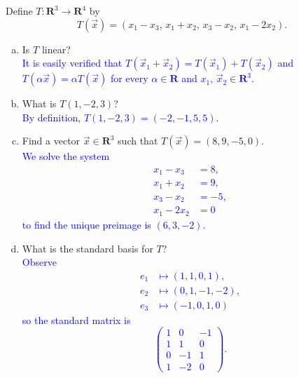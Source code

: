 \documentclass[a4paper,11pt]{article}
\newcommand{\R}{\mathbf{R}}
\newcommand{\BB}[1]{\textcolor{blue}{#1}}
\begin{document}
 Define $T : \R^3 \rightarrow \R^4$ by
\[
  T(\vec x) = (x_1-x_3,\, x_1+x_2,\,x_3-x_2,\,x_1-2x_2).
\]
\begin{enumerate}[(a)]
\item Is $T$ linear? \\

  \BB{It is easily verified that $T(\vec x_1 + \vec x_2)=T(\vec x_1) + T(\vec
    x_2)$ and $T(\alpha\vec x)=\alpha T(\vec x)$ for every $\alpha \in \R$ and
    $x_1,\,\vec x_2 \in \R^3$. \\}
  
\item What is $T(1,-2,3)$? \\

  \BB{By definition, $T(1,-2,3)=(-2,-1,5,5)$. \\}
  
\item Find a vector $\vec x \in \R^3$ such that $T(\vec x)=(8,9,-5,0)$. \\

  \BB{We solve the system
    \begin{align*}
      x_1 - x_3 &= 8, \\
      x_1 + x_2 &= 9, \\
      x_3 - x_2 &= -5, \\
      x_1 - 2x_2 &= 0
    \end{align*}
    to find the unique preimage is $(6,3,-2)$. \\}
  
\item What is the standard basis for $T$? \\

  \BB{Observe
    \begin{align*}
      e_1 &\mapsto (1,1,0,1), \\
      e_2 &\mapsto (0,1,-1,-2), \\
      e_3 &\mapsto (-1,0,1,0)
    \end{align*}
    so the standard matrix is
    \[
      \left(
        \begin{array}{rrr}
          1 & 0 & -1 \\
          1 & 1 & 0 \\
          0 & -1 & 1 \\
          1 & -2 & 0
        \end{array}
      \right).
    \] \\
  }
\end{enumerate}
\end{document}
